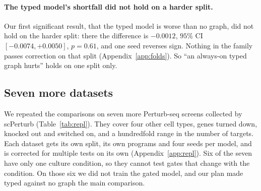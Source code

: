 \documentclass{article}
\begin{document}
\paragraph{The typed model's shortfall did not hold on a harder split.} Our first significant result,
that the typed model is worse than no graph, did not hold on the harder split: there the difference is
$-0.0012$, $95\%$ CI $[-0.0074,+0.0050]$, $p=0.61$, and one seed reverses sign. Nothing in the family
passes correction on that split (Appendix~\ref{app:folds}). So ``an always-on typed graph hurts'' holds on
one split only.

\subsection{Seven more datasets}
\label{sec:repl}

We repeated the comparisons on seven more Perturb-seq screens collected by scPerturb
\citep{peidli2024scperturb} (Table~\ref{tab:repl}). They cover four other cell types, genes turned down,
knocked out and switched on, and a hundredfold range in the number of targets. Each dataset gets its own
split, its own programs and four seeds per model, and is corrected for multiple tests on its own
(Appendix~\ref{app:repl}). Six of the seven have only one culture condition, so they cannot test gates
that change with the condition. On those six we did not train the gated model, and our plan made typed
against no graph the main comparison.
\end{document}
